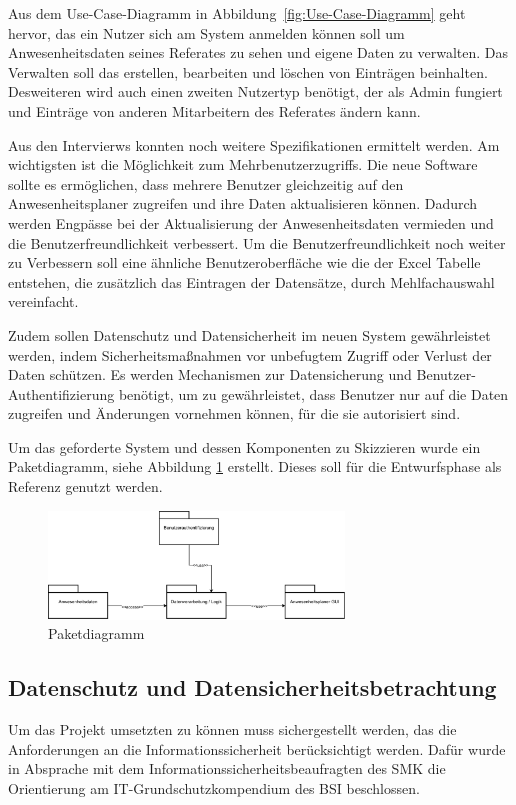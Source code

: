Aus dem Use-Case-Diagramm in Abbildung~\ref{fig:Use-Case-Diagramm} geht hervor, das ein Nutzer sich am System anmelden können soll um Anwesenheitsdaten seines Referates zu sehen und eigene Daten zu verwalten. Das Verwalten soll das erstellen, bearbeiten und löschen von Einträgen beinhalten. Desweiteren wird auch einen zweiten Nutzertyp benötigt, der als Admin fungiert und Einträge von anderen Mitarbeitern des Referates ändern kann.

Aus den Intervierws konnten noch weitere Spezifikationen ermittelt werden. Am wichtigsten ist die Möglichkeit zum Mehrbenutzerzugriffs. Die neue Software sollte es ermöglichen, dass mehrere Benutzer gleichzeitig auf den Anwesenheitsplaner zugreifen und ihre Daten aktualisieren können. Dadurch werden Engpässe bei der Aktualisierung der Anwesenheitsdaten vermieden und die Benutzerfreundlichkeit verbessert. Um die Benutzerfreundlichkeit noch weiter zu Verbessern soll eine ähnliche Benutzeroberfläche wie die der Excel Tabelle entstehen, die zusätzlich das Eintragen der Datensätze, durch \zB Mehlfachauswahl vereinfacht.

Zudem sollen Datenschutz und Datensicherheit im neuen System gewährleistet werden, indem Sicherheitsmaßnahmen vor unbefugtem Zugriff oder Verlust der Daten schützen. Es werden Mechanismen zur Datensicherung und Benutzer-Authentifizierung benötigt, um zu gewährleistet, dass Benutzer nur auf die Daten zugreifen und Änderungen vornehmen können, für die sie autorisiert sind.

Um das geforderte System und dessen Komponenten zu Skizzieren wurde ein Paketdiagramm, siehe Abbildung \ref{abb:Paketdiagramm} erstellt. Dieses soll für die Entwurfsphase als Referenz genutzt werden.

\begin{figure}[htbp]
    \centering
    \includegraphics[width=0.7\textwidth,angle=0]{abb/Paketdiagramm.pdf}
    \caption[Paketdiagramm: Skizze das Systems und dessen Komponenten]{Paketdiagramm}
    \label{abb:Paketdiagramm}
\end{figure}

\subsection{Datenschutz und Datensicherheitsbetrachtung}
\label{sec:Datenschutz}
Um das Projekt umsetzten zu können muss sichergestellt werden, das die Anforderungen an die Informationssicherheit berücksichtigt werden. Dafür wurde in Absprache mit dem Informationssicherheitsbeaufragten des SMK die Orientierung am IT-Grundschutzkompendium des BSI beschlossen.

